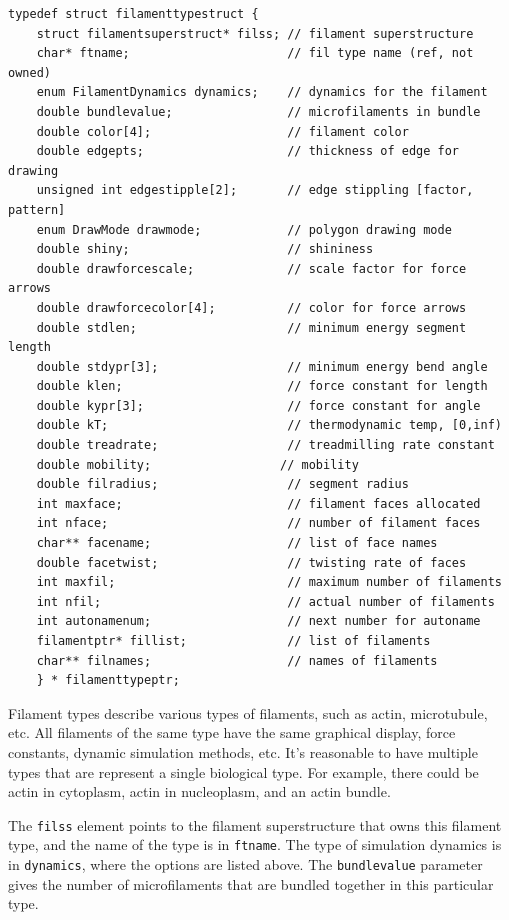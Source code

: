 \documentclass {scrbook}
\newcommand {\ttt} {\texttt}
\begin{document}
\begin{lstlisting}
typedef struct filamenttypestruct {
    struct filamentsuperstruct* filss; // filament superstructure
    char* ftname;                      // fil type name (ref, not owned)
    enum FilamentDynamics dynamics;    // dynamics for the filament
    double bundlevalue;                // microfilaments in bundle
    double color[4];                   // filament color
    double edgepts;                    // thickness of edge for drawing
    unsigned int edgestipple[2];       // edge stippling [factor, pattern]
    enum DrawMode drawmode;            // polygon drawing mode
    double shiny;                      // shininess
    double drawforcescale;             // scale factor for force arrows
    double drawforcecolor[4];          // color for force arrows
    double stdlen;                     // minimum energy segment length
    double stdypr[3];                  // minimum energy bend angle
    double klen;                       // force constant for length
    double kypr[3];                    // force constant for angle
    double kT;                         // thermodynamic temp, [0,inf)
    double treadrate;                  // treadmilling rate constant
    double mobility;                  // mobility
    double filradius;                  // segment radius
    int maxface;                       // filament faces allocated
    int nface;                         // number of filament faces
    char** facename;                   // list of face names
    double facetwist;                  // twisting rate of faces
    int maxfil;                        // maximum number of filaments
    int nfil;                          // actual number of filaments
    int autonamenum;                   // next number for autoname
    filamentptr* fillist;              // list of filaments
    char** filnames;                   // names of filaments
    } * filamenttypeptr;
\end{lstlisting}

Filament types describe various types of filaments, such as actin, microtubule, etc. All filaments of the same type have the same graphical display, force constants, dynamic simulation methods, etc. It's reasonable to have multiple types that are represent a single biological type. For example, there could be actin in cytoplasm, actin in nucleoplasm, and an actin bundle.

The \ttt{filss} element points to the filament superstructure that owns this filament type, and the name of the type is in \ttt{ftname}. The type of simulation dynamics is in \ttt{dynamics}, where the options are listed above. The \ttt{bundlevalue} parameter gives the number of microfilaments that are bundled together in this particular type.
\end{document}
